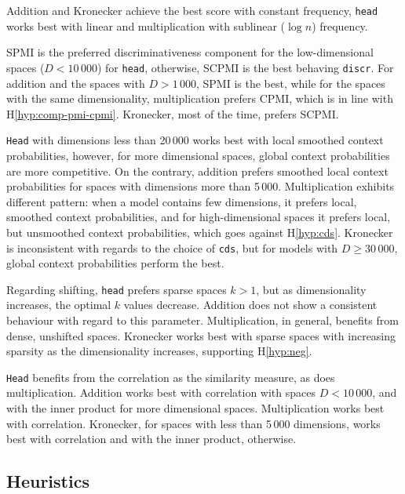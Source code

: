 Addition and Kronecker achieve the best score with constant frequency, \texttt{head} works best with linear and multiplication with sublinear ($\log n$) frequency.

SPMI is the preferred discriminativeness component for the low-dimensional spaces ($D < 10\,000$) for \texttt{head}, otherwise, SCPMI is the best behaving \texttt{discr}. For addition and the spaces with $D > 1\,000$, SPMI is the best, while for the spaces with the same dimensionality, multiplication prefers CPMI, which is in line with H\ref{hyp:comp-pmi-cpmi}. Kronecker, most of the time, prefers SCPMI.

\texttt{Head} with dimensions less than 20\,000 works best with local smoothed context probabilities, however, for more dimensional spaces, global context probabilities are more competitive. On the contrary, addition prefers smoothed local context probabilities for spaces with dimensions more than 5\,000. Multiplication exhibits different pattern: when a model contains few dimensions, it prefers local, smoothed context probabilities, and for high-dimensional spaces it prefers local, but unsmoothed context probabilities, which goes against H\ref{hyp:cds}. Kronecker is inconsistent with regards to the choice of \texttt{cds}, but for models with $D \geq 30\,000$, global context probabilities perform the best.

Regarding shifting, \texttt{head} prefers sparse spaces $k > 1$, but as dimensionality increases, the optimal $k$ values decrease. Addition does not show a consistent behaviour with regard to this parameter. Multiplication, in general, benefits from dense, unshifted spaces. Kronecker works best with sparse spaces with increasing sparsity as the dimensionality increases, supporting H\ref{hyp:neg}.

\texttt{Head} benefits from the correlation as the similarity measure, as does multiplication. Addition works best with correlation with spaces $D < 10\,000$, and with the inner product for more dimensional spaces. Multiplication works best with correlation. Kronecker, for spaces with less than 5\,000 dimensions, works best with correlation and with the inner product, otherwise.

\subsection{Heuristics}
\label{sec:heuristics-phraserel}



